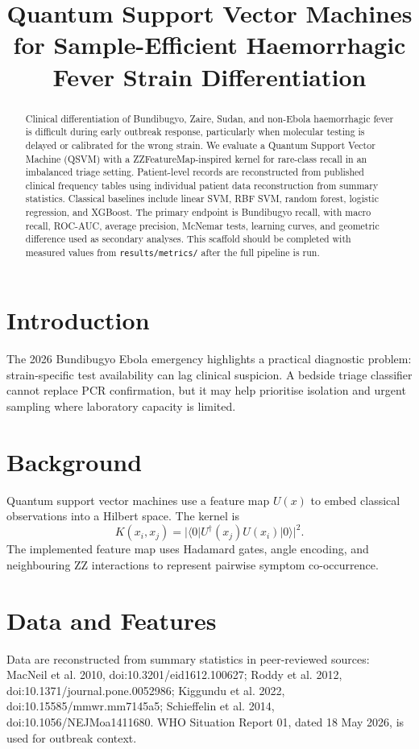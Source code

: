 \documentclass[11pt]{article}
\title{Quantum Support Vector Machines for Sample-Efficient Haemorrhagic Fever Strain Differentiation}
\author{}
\date{}
\begin{document}
\maketitle

\begin{abstract}
Clinical differentiation of Bundibugyo, Zaire, Sudan, and non-Ebola haemorrhagic fever is difficult during early outbreak response, particularly when molecular testing is delayed or calibrated for the wrong strain. We evaluate a Quantum Support Vector Machine (QSVM) with a ZZFeatureMap-inspired kernel for rare-class recall in an imbalanced triage setting. Patient-level records are reconstructed from published clinical frequency tables using individual patient data reconstruction from summary statistics. Classical baselines include linear SVM, RBF SVM, random forest, logistic regression, and XGBoost. The primary endpoint is Bundibugyo recall, with macro recall, ROC-AUC, average precision, McNemar tests, learning curves, and geometric difference used as secondary analyses. This scaffold should be completed with measured values from \texttt{results/metrics/} after the full pipeline is run.
\end{abstract}

\section{Introduction}
The 2026 Bundibugyo Ebola emergency highlights a practical diagnostic problem: strain-specific test availability can lag clinical suspicion. A bedside triage classifier cannot replace PCR confirmation, but it may help prioritise isolation and urgent sampling where laboratory capacity is limited.

\section{Background}
Quantum support vector machines use a feature map $U(x)$ to embed classical observations into a Hilbert space. The kernel is
\[
K(x_i, x_j) = |\langle 0 | U^\dagger(x_j) U(x_i) | 0 \rangle|^2.
\]
The implemented feature map uses Hadamard gates, angle encoding, and neighbouring ZZ interactions to represent pairwise symptom co-occurrence.

\section{Data and Features}
Data are reconstructed from summary statistics in peer-reviewed sources: MacNeil et al. 2010, doi:10.3201/eid1612.100627; Roddy et al. 2012, doi:10.1371/journal.pone.0052986; Kiggundu et al. 2022, doi:10.15585/mmwr.mm7145a5; Schieffelin et al. 2014, doi:10.1056/NEJMoa1411680. WHO Situation Report 01, dated 18 May 2026, is used for outbreak context.
\end{document}
